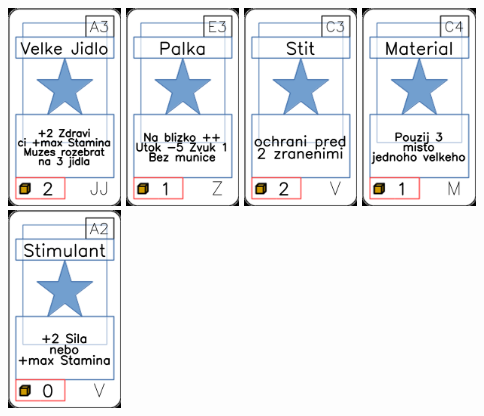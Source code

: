 \documentclass[a4paper]{article}
\begin{document}
	\includegraphics[width=3.0cm]{img-1_32}
	\includegraphics[width=3.0cm]{img-1_82}
	\includegraphics[width=3.0cm]{img-1_72}
	\includegraphics[width=3.0cm]{img-1_43}
	\includegraphics[width=3.0cm]{img-1_61}
\end{document}
